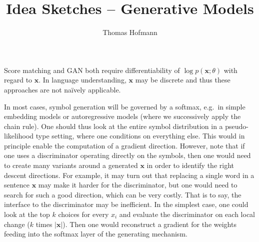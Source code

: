 \documentclass{article}
\title{Idea Sketches -- Generative Models}
\author{Thomas Hofmann}
\newcommand{\x}{{\mathbf x}}
\begin{document}
\maketitle

Score matching and GAN both require differentiability of $\log p(\x; \theta)$ with regard to $\x$. In language understanding, $\x$ may be discrete and thus these approaches are not na\"ively applicable. 

In most cases, symbol generation will be governed by a softmax, e.g.~in simple embedding models or autoregressive models (where we successively apply the chain rule). One should thus look at the entire symbol distribution in a pseudo-likelihood type setting, where one conditions on everything else. This would in principle enable the computation of a gradient direction. However, note that if one uses a discriminator operating directly on the symbols, then one would need to create many variants around a generated $\x$ in order to identify the right descent directions. For example, it may turn out that replacing a single word in a sentence $\x$ may make it harder for the discriminator, but one would need to search for such a good direction, which can be very costly. That is to say, the interface to the discriminator may be inefficient. In the simplest case, one could look at the top $k$ choices for every $x_i$ and evaluate the discriminator on each local change ($k$ times $|\x|$). Then one would reconstruct a gradient for the weights feeding into the softmax layer of the generating mechanism. 







\end{document}
